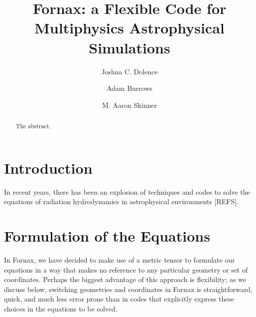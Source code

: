 \documentclass[iop]{emulateapj}
\begin{document}
\title{Fornax: a Flexible Code for Multiphysics Astrophysical Simulations}

\author{Joshua C. Dolence}
\author{Adam Burrows}
\author{M. Aaron Skinner}


\begin{abstract}
The abstract.
\end{abstract}


\section{Introduction}
In recent years, there has been an explosion of techniques and codes to solve the equations of radiation hydrodynamics in astrophysical environments [REFS].  

\section{Formulation of the Equations}
\label{sec:formulation}
In Fornax, we have decided to make use of a metric tensor to formulate our equations in a way that makes no reference to any particular geometry or set of coordinates.  Perhaps the biggest advantage of this approach is flexibility; as we discuss below, switching geometries and coordinates in Fornax is straightforward, quick, and much less error prone than in codes that explicitly express these choices in the equations to be solved.
\end{document}
